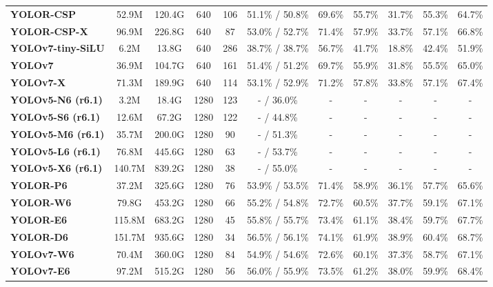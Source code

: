 \documentclass[10pt,twocolumn,letterpaper]{article}
\begin{document}
\begin{table*}[t]
\begin{threeparttable}[t]
\begin{tabular}{l|c|c|c|c|c|ccccc}
					\midrule
					\textbf{YOLOR-CSP \cite{wang2021you}} & 52.9M & 120.4G & 640 & 106 & 51.1\% / 50.8\% & 69.6\% & 55.7\% & 31.7\% & 55.3\% & 64.7\% \\
					\textbf{YOLOR-CSP-X \cite{wang2021you}} & 96.9M & 226.8G & 640 & 87 & 53.0\% / 52.7\% & 71.4\% & 57.9\% & 33.7\% & 57.1\% & 66.8\% \\
					\midrule
					\textbf{YOLOv7-tiny-SiLU} & 6.2M & 13.8G & 640 & 286 & 38.7\% / 38.7\% & 56.7\% & 41.7\% & 18.8\% & 42.4\% & 51.9\% \\
					\textbf{YOLOv7} & 36.9M & 104.7G & 640 & 161 & 51.4\% / 51.2\% & 69.7\% & 55.9\% & 31.8\% & 55.5\% & 65.0\% \\
					\textbf{YOLOv7-X} & 71.3M & 189.9G & 640 & 114 & 53.1\% / 52.9\% & 71.2\% & 57.8\% & 33.8\% & 57.1\% & 67.4\% \\
					\midrule
					\midrule
					\textbf{YOLOv5-N6 (r6.1) \cite{glenn2022yolov5}} & 3.2M & 18.4G & 1280 & 123 & - / 36.0\% & - & - & - & - & - \\
					\textbf{YOLOv5-S6 (r6.1) \cite{glenn2022yolov5}} & 12.6M & 67.2G & 1280 & 122 & - / 44.8\% & - & - & - & - & - \\
					\textbf{YOLOv5-M6 (r6.1) \cite{glenn2022yolov5}} & 35.7M & 200.0G & 1280 & 90 & - / 51.3\% & - & - & - & - & - \\
					\textbf{YOLOv5-L6 (r6.1) \cite{glenn2022yolov5}} & 76.8M & 445.6G & 1280 & 63 & - / 53.7\% & - & - & - & - & - \\
					\textbf{YOLOv5-X6 (r6.1) \cite{glenn2022yolov5}} & 140.7M & 839.2G & 1280 & 38 & - / 55.0\% & - & - & - & - & - \\
					\midrule
					\textbf{YOLOR-P6 \cite{wang2021you}} & 37.2M & 325.6G & 1280 & 76 & 53.9\% / 53.5\% & 71.4\% & 58.9\% & 36.1\% & 57.7\% & 65.6\% \\
					\textbf{YOLOR-W6 \cite{wang2021you}} & 79.8G & 453.2G & 1280 & 66 & 55.2\% / 54.8\% & 72.7\% & 60.5\% & 37.7\% & 59.1\% & 67.1\% \\
					\textbf{YOLOR-E6 \cite{wang2021you}} & 115.8M & 683.2G & 1280 & 45 & 55.8\% / 55.7\% & 73.4\% & 61.1\% & 38.4\% & 59.7\% & 67.7\% \\
					\textbf{YOLOR-D6 \cite{wang2021you}} & 151.7M & 935.6G & 1280 & 34 & 56.5\% / 56.1\% & 74.1\% & 61.9\% & 38.9\% & 60.4\% & 68.7\% \\
					\midrule
					\textbf{YOLOv7-W6} & 70.4M & 360.0G & 1280 & 84 & 54.9\% / 54.6\% & 72.6\% & 60.1\% & 37.3\% & 58.7\% & 67.1\% \\
					\textbf{YOLOv7-E6} & 97.2M & 515.2G & 1280 & 56 & 56.0\% / 55.9\% & 73.5\% & 61.2\% & 38.0\% & 59.9\% & 68.4\% \\

\end{tabular}
\end{threeparttable}
\end{table*}
\end{document}
